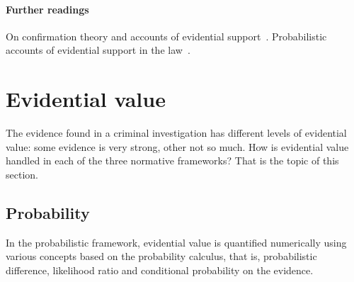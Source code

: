 \documentclass[10pt]{article}
\begin{document}
\paragraph{Further readings} 
On confirmation theory and accounts of 
evidential support~\citep{carnap1950, fitelson1999, skyrms1999, hacking2001, bovensEtAl2003, crupi2015}.
Probabilistic accounts of evidential 
support in the law~\citep{lempert1977}.



\section{Evidential value}
\label{sec:str}

The evidence found in a criminal investigation has different levels of evidential value: some evidence is very strong, other not so much. How is evidential value handled in each of the three normative frameworks? That is the topic of this section.

\subsection{Probability}

In the probabilistic framework, evidential value is quantified numerically using various 
concepts based 
on the probability calculus, that is, 
probabilistic difference, likelihood ratio and conditional probability on the evidence.
	
\end{document}
